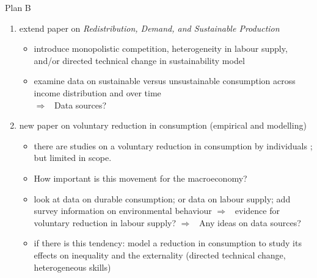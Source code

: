 \documentclass[11pt,aspectratio=169]{beamer}
\newcommand{\ar}{$\Rightarrow$ \ }
\begin{document}


\begin{frame}{Plan B}
\begin{enumerate}
	\item extend paper on \textit{Redistribution, Demand, and Sustainable Production}
	\begin{itemize}
\item introduce monopolistic competition, heterogeneity in labour supply, and/or directed technical change in sustainability model
\item examine data on sustainable versus unsustainable consumption across income distribution and over time \\
\alert{\ar Data sources?}
	\end{itemize}
\pause
\item new paper on voluntary reduction in consumption (empirical and modelling)
\begin{itemize}
	\item there are studies on a voluntary reduction in consumption by individuals \citep{Alexander2012TheContext}; but limited in scope. 
	\item How important is this movement for the macroeconomy?
\item look at data on durable consumption; or data on labour supply; add survey information on environmental behaviour \ar evidence for voluntary reduction in labour supply?
\alert{\ar Any ideas on data sources?}
\item if there is this tendency: model a reduction in consumption to study its effects on inequality and the externality \small{(directed technical change, heterogeneous skills)}
\end{itemize}
\end{enumerate}
\end{frame}
\end{document}
